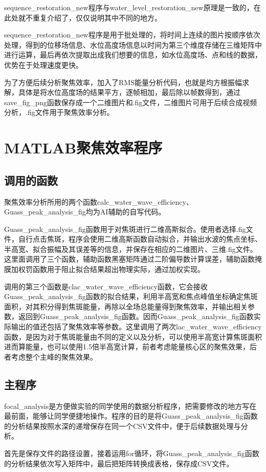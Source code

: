 \documentclass[11pt,a4paper]{ctexart}
\begin{document}
sequence\_restoration\_new程序与water\_level\_restoration\_new原理是一致的，在此处就不重复介绍了，仅仅说明其中不同的地方。

sequence\_restoration\_new程序是用于批处理的，将时间上连续的图片按顺序依次处理，得到的位移场信息、水位高度场信息以时间为第三个维度存储在三维矩阵中进行运算，最后再依次提取出成我们想要的信息，如水位高度场、点和线的数据，优势在于处理速度更快。

为了方便后续分析聚焦效率，加入了RMS能量分析代码，也就是均方根振幅求解，具体是将水位高度场的结果平方，逐帧相加，最后除以帧数得到，通过save\_fig\_png函数保存成一个二维图片和.fig文件，二维图片可用于后续合成视频分析，.fig文件用于聚焦效率分析。

\section{MATLAB聚焦效率程序}
\subsection{调用的函数}
聚焦效率分析所用的两个函数calc\_water\_wave\_efficiency、Guass\_peak\_analysis\_fig均为AI辅助的自写代码。

Guass\_peak\_analysis\_fig函数用于对焦斑进行二维高斯拟合。使用者选择.fig文件，自行点击焦斑，程序会使用二维高斯函数自动拟合，并输出水波的焦点坐标、半高宽、拟合振幅及其误差等的信息，并保存在相应的二维图片、三维.fig文件。这里面调用了三个函数，辅助函数黑塞矩阵通过二阶偏导数计算误差，辅助函数掩膜加权罚函数用于阻止拟合结果超出物理实际，通过加权实现。

调用的第三个函数是clac\_water\_wave\_efficiency函数，它会接收Guass\_peak\_analysis\_fig函数的拟合结果，利用半高宽和焦点峰值坐标确定焦斑面积，对其积分得到焦斑能量，再除以全场总能量得到聚焦效率，并输出相关参数，返回到Guass\_peak\_analysis\_fig函数。因而Guass\_peak\_analysis\_fig函数实际输出的值还包括了聚焦效率等参数。这里调用了两次lac\_water\_wave\_efficiency函数，是因为对于焦斑能量由不同的定义以及分析，可以使用半高宽计算焦斑面积进而算能量，也可以使用1.5倍半高宽计算，前者考虑能量核心区的聚焦效果，后者考虑整个主峰的聚焦效果。

\subsection{主程序}
focal\_analysis是方便做实验的同学使用的数据分析程序，把需要修改的地方写在最前面，能够让同学便捷地操作。程序的目的是将Guass\_peak\_analysis\_fig函数的分析结果按照水深的递增保存在同一个CSV文件中，便于后续数据处理与分析。

首先是保存文件的路径设置，接着运用for循环，将Guass\_peak\_analysis\_fig函数的分析结果依次写入矩阵中，最后把矩阵转换成表格，保存成CSV文件。
\end{document}
